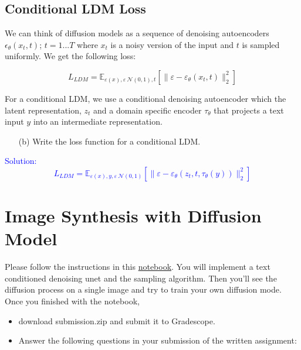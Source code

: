 \documentclass[a4paper]{article}
\begin{document}
\subsection{Conditional LDM Loss}
We can think of diffusion models as a sequence of denoising autoencoders \(\epsilon_{\theta}(x_t, t)\); \(t = 1...T\) where \(x_t\) is a noisy version of the input and  \(t\) is sampled uniformly. We get the following loss:

\[L_{LDM} = \mathbb{E}_{\varepsilon(x), \varepsilon ~ \mathcal{N}(0, 1), t} [\| \varepsilon - \varepsilon_{\theta}(x_t, t) \|_2^2 ] \]

For a conditional LDM, we use a conditional denoising autoencoder which the latent representation, \(z_t\) and a domain specific encoder \(\tau_{\theta}\) that projects a text input \(y\) into an intermediate representation. 
\begin{itemize}
    \item [(b)]
    Write the loss function for a conditional LDM.
   
\end{itemize}
 \textcolor{blue}{Solution: \[L_{LDM} = \mathbb{E}_{\varepsilon(x), y, \varepsilon ~ \mathcal{N}(0, 1)} [\| \varepsilon - \varepsilon_{\theta}(z_t, t, \tau_{\theta}(y)) \|_2^2] \]}


\section{Image Synthesis with Diffusion Model}

Please follow the instructions in this \href{https://colab.research.google.com/drive/1mmyvwlYvAnnfIBIr29bMvOEnL2mUcPHm?usp=sharing}{notebook}. 
You will implement a text conditioned denoising unet and the sampling algorithm. Then you'll see the diffusion process on a single image and try to train your own diffusion mode. Once you finished with the notebook,
\begin{itemize}
    \item download submission.zip and submit it to Gradescope.

    \item Answer the following questions in your submission of the written assignment:
\end{itemize}
\end{document}
